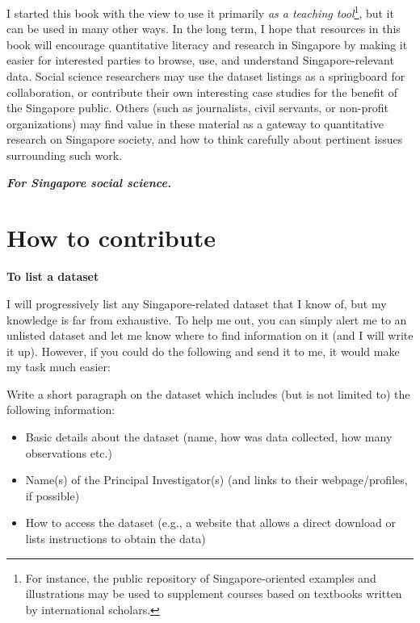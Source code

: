 \documentclass[
  openany]{book}
\providecommand{\tightlist}{%
  \setlength{\itemsep}{0pt}\setlength{\parskip}{0pt}}
\begin{document}
I started this book with the view to use it primarily \emph{as a teaching tool}\footnote{For instance, the public repository of Singapore-oriented examples and illustrations may be used to supplement courses based on textbooks written by international scholars.}, but it can be used in many other ways. In the long term, I hope that resources in this book will encourage quantitative literacy and research in Singapore by making it easier for interested parties to browse, use, and understand Singapore-relevant data. Social science researchers may use the dataset listings as a springboard for collaboration, or contribute their own interesting case studies for the benefit of the Singapore public. Others (such as journalists, civil servants, or non-profit organizations) may find value in these material as a gateway to quantitative research on Singapore society, and how to think carefully about pertinent issues surrounding such work.

\textbf{\emph{For Singapore social science.}}

\hypertarget{how-to-contribute}{%
\section*{How to contribute}\label{how-to-contribute}}

\textbf{To list a dataset}

I will progressively list any Singapore-related dataset that I know of, but my knowledge is far from exhaustive. To help me out, you can simply alert me to an unlisted dataset and let me know where to find information on it (and I will write it up). However, if you could do the following and send it to me, it would make my task much easier:

Write a short paragraph on the dataset which includes (but is not limited to) the following information:

\begin{itemize}
\tightlist
\item
  Basic details about the dataset (name, how was data collected, how many observations etc.)
\item
  Name(s) of the Principal Investigator(s) (and links to their webpage/profiles, if possible)
\item
  How to access the dataset (e.g., a website that allows a direct download or lists instructions to obtain the data)
\end{itemize}
\end{document}
